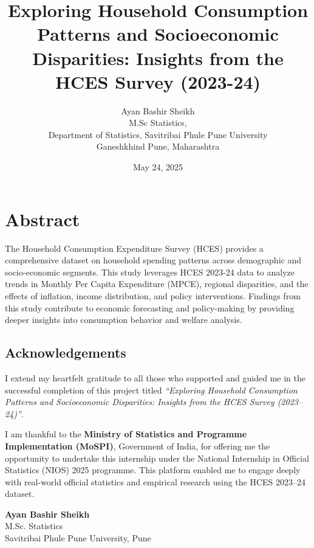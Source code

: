 \documentclass{article}
\begin{document}
	
	\title{Exploring Household Consumption Patterns and Socioeconomic Disparities: Insights from the HCES Survey (2023-24)}
	\author{Ayan Bashir Sheikh \\ M.Sc Statistics,\\ Department of Statistics, Savitribai Phule Pune University \\Ganeshkhind Pune, Maharashtra}
	\date{May 24, 2025}	
	\maketitle	
	\newpage
		\tableofcontents
		
\newpage
	\section{Abstract}
	The Household Consumption Expenditure Survey (HCES) provides a comprehensive dataset on household spending patterns across demographic and socio-economic segments. This study leverages HCES 2023-24 data to analyze trends in Monthly Per Capita Expenditure (MPCE), regional disparities, and the effects of inflation, income distribution, and policy interventions. Findings from this study contribute to economic forecasting and policy-making by providing deeper insights into consumption behavior and welfare analysis.
	\newpage

\begin{center}
	

\section*{ Acknowledgements}
\end{center}


I extend my heartfelt gratitude to all those who supported and guided me in the successful completion of this project titled \textit{“Exploring Household Consumption Patterns and Socioeconomic Disparities: Insights from the HCES Survey (2023–24)”}.

I am thankful to the \textbf{Ministry of Statistics and Programme Implementation (MoSPI)}, Government of India, for offering me the opportunity to undertake this internship under the National Internship in Official Statistics (NIOS) 2025 programme. This platform enabled me to engage deeply with real-world official statistics and empirical research using the HCES 2023–24 dataset.

\bigskip
\begin{flushright} 
	\textbf{Ayan Bashir Sheikh} \\
	M.Sc. Statistics \\
	Savitribai Phule Pune University, Pune
\end{flushright}
\end{document}
